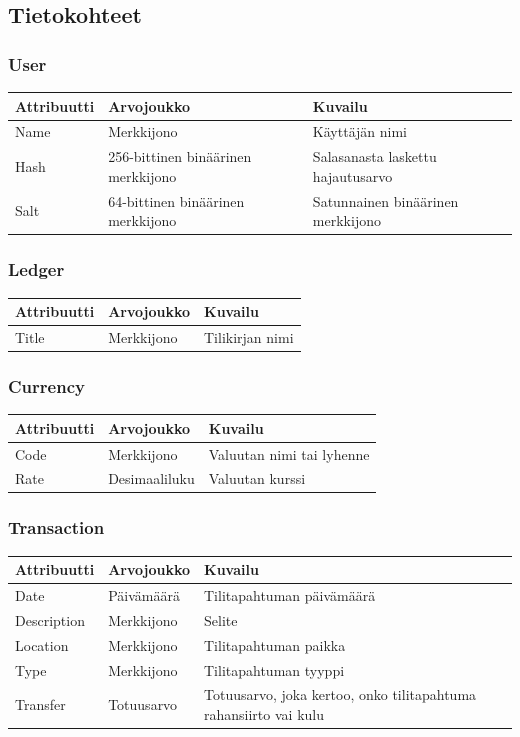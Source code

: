 \documentclass[a4paper]{scrartcl}
\begin{document}
\subsection{Tietokohteet}

\subsubsection{User}
\begin{tabular}{ | l | l | l | }
  \hline
  \textbf{Attribuutti} & \textbf{Arvojoukko} & \textbf{Kuvailu} \\ \hline
  Name & Merkkijono & Käyttäjän nimi \\ \hline
  Hash & 256-bittinen binäärinen merkkijono &
    Salasanasta laskettu hajautusarvo
    \\ \hline
  Salt & 64-bittinen binäärinen merkkijono & Satunnainen binäärinen merkkijono
    \\ \hline
\end{tabular}

\subsubsection{Ledger}
\begin{tabular}{ | l | l | l | }
  \hline
  \textbf{Attribuutti} & \textbf{Arvojoukko} & \textbf{Kuvailu} \\ \hline
  Title & Merkkijono & Tilikirjan nimi \\ \hline
\end{tabular}

\subsubsection{Currency}
\begin{tabular}{ | l | l | l | }
  \hline
  \textbf{Attribuutti} & \textbf{Arvojoukko} & \textbf{Kuvailu} \\ \hline
  Code & Merkkijono & Valuutan nimi tai lyhenne \\ \hline
  Rate & Desimaaliluku & Valuutan kurssi \\ \hline
\end{tabular}

\subsubsection{Transaction}
\begin{tabular}{ | l | l | l | }
  \hline
  \textbf{Attribuutti} & \textbf{Arvojoukko} & \textbf{Kuvailu} \\ \hline
  Date & Päivämäärä & Tilitapahtuman päivämäärä \\ \hline
  Description & Merkkijono & Selite \\ \hline
  Location & Merkkijono & Tilitapahtuman paikka \\ \hline
  Type & Merkkijono & Tilitapahtuman tyyppi \\ \hline
  Transfer & Totuusarvo & Totuusarvo, joka kertoo, onko tilitapahtuma
    rahansiirto vai kulu \\ \hline
\end{tabular}
\end{document}
